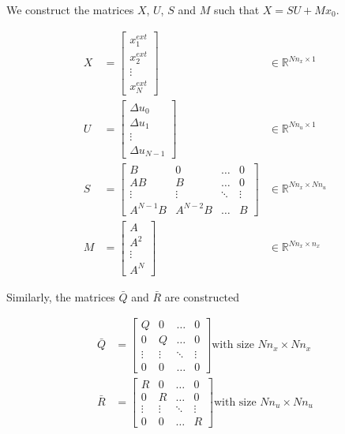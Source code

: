 \documentclass{article}
\begin{document}
We construct the matrices $X$, $U$, $S$ and $M$ such that $X = SU + Mx_0$.

$$
\begin{aligned}
  X &=
  \begin{bmatrix}
    x_1^{ext} \\
    x_2^{ext} \\
    \vdots \\
    x_N^{ext}
  \end{bmatrix} & \in \mathbb{R}^{Nn_x \times 1} \\
  U &=
  \begin{bmatrix}
    \Delta u_0 \\
    \Delta u_1 \\
    \vdots \\
    \Delta u_{N-1}
  \end{bmatrix} & \in \mathbb{R}^{Nn_u \times 1} \\
  S &=
  \begin{bmatrix}
    B & 0 & \ldots & 0 \\
    AB & B & \ldots & 0 \\
    \vdots & \vdots & \ddots & \vdots \\
    A^{N-1} B & A^{N-2} B & \ldots & B
  \end{bmatrix} & \in \mathbb{R}^{Nn_x \times Nn_u} \\
  M &=
  \begin{bmatrix}
    A \\
    A^2 \\
    \vdots \\
    A^N
  \end{bmatrix} & \in \mathbb{R}^{Nn_x \times n_x}
\end{aligned}
$$

Similarly, the matrices $\bar{Q}$ and $\bar{R}$ are constructed

$$
\begin{aligned}
  \bar{Q} &=
  \begin{bmatrix}
    Q & 0 & \ldots & 0 \\
    0 & Q & \ldots & 0 \\
    \vdots & \vdots & \ddots & \vdots \\
    0 & 0 & \ldots & 0
  \end{bmatrix} \text{with size } Nn_x \times Nn_x \\
  \bar{R} &=
  \begin{bmatrix}
    R & 0 & \ldots & 0 \\
    0 & R & \ldots & 0 \\
    \vdots & \vdots & \ddots & \vdots \\
    0 & 0 & \ldots & R
  \end{bmatrix} \text{with size } Nn_u \times Nn_u
\end{aligned}
$$
\end{document}
